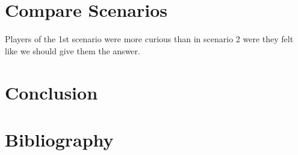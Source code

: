 \documentclass[10pt]{article}
\begin{document}
\section{Compare Scenarios}
Players of the 1st scenario were more curious than in scenario 2 were they felt
like we should give them the answer.

\section{Conclusion}

\newpage
\nocite{*}
\section{Bibliography}




\end{document}
